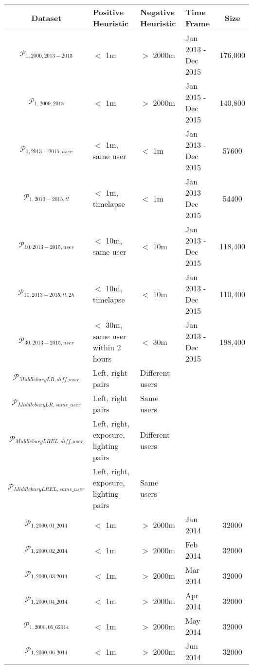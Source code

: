 \begin{table}
	\centering
	\begin{tabular}{c >{\centering\arraybackslash}m{3.2cm} >{\centering\arraybackslash}m{3cm} >{\centering\arraybackslash}m{2cm} c}
		\toprule
		\bfseries{Dataset} &  \bfseries Positive Heuristic & \bfseries Negative Heuristic & \bfseries Time Frame & \bfseries{Size}\\
		\midrule
		$\mathcal{P}_{1,2000,2013-2015}$ & $<$ 1m & $>$ 2000m & Jan 2013 - Dec 2015  & 176,000\\
		$\mathcal{P}_{1,2000,2015}$ & $<$ 1m & $>$ 2000m & Jan 2015 - Dec 2015  & 140,800\\
		$\mathcal{P}_{1,2013-2015,user}$ & $<$ 1m, same user & $<$ 1m & Jan 2013 - Dec 2015  & 57600\\
		$\mathcal{P}_{1,2013-2015,tl}$ & $<$ 1m, timelapse & $<$ 1m & Jan 2013 - Dec 2015  & 54400\\
		$\mathcal{P}_{10,2013-2015,user}$ & $<$ 10m, same user & $<$ 10m & Jan 2013 - Dec 2015  & 118,400\\
		$\mathcal{P}_{10,2013-2015,tl,2h}$ & $<$ 10m, timelapse & $<$ 10m & Jan 2013 - Dec 2015  & 110,400\\
		$\mathcal{P}_{30,2013-2015,user}$ & $<$ 30m, same user within 2 hours & $<$ 30m & Jan 2013 - Dec 2015  & 198,400\\
		$\mathcal{P}_{MiddleburyLR,diff\_user}$ & Left, right pairs & Different users  & 32000\\
		$\mathcal{P}_{MiddleburyLR,same\_user}$ & Left, right pairs& Same users  & 32000\\
		$\mathcal{P}_{MiddleburyLREL,diff\_user}$ & Left, right, exposure, lighting pairs  & Different users  & 32000\\
		$\mathcal{P}_{MiddleburyLREL,same\_user}$ & Left, right, exposure, lighting pairs  & Same users  & 32000\\
		$\mathcal{P}_{1,2000,01\_2014}$ & $<$ 1m & $>$ 2000m & Jan 2014  & 32000\\
		$\mathcal{P}_{1,2000,02\_2014}$ & $<$ 1m & $>$ 2000m & Feb 2014  & 32000\\
		$\mathcal{P}_{1,2000,03\_2014}$ & $<$ 1m & $>$ 2000m & Mar 2014 & 32000\\
		$\mathcal{P}_{1,2000,04\_2014}$ & $<$ 1m & $>$ 2000m & Apr 2014  & 32000\\
		$\mathcal{P}_{1,2000,05\_62014}$ & $<$ 1m & $>$ 2000m & May 2014  & 32000\\
		$\mathcal{P}_{1,2000,06\_2014}$ & $<$ 1m & $>$ 2000m & Jun 2014  & 32000\\

\end{tabular}
\end{table}
